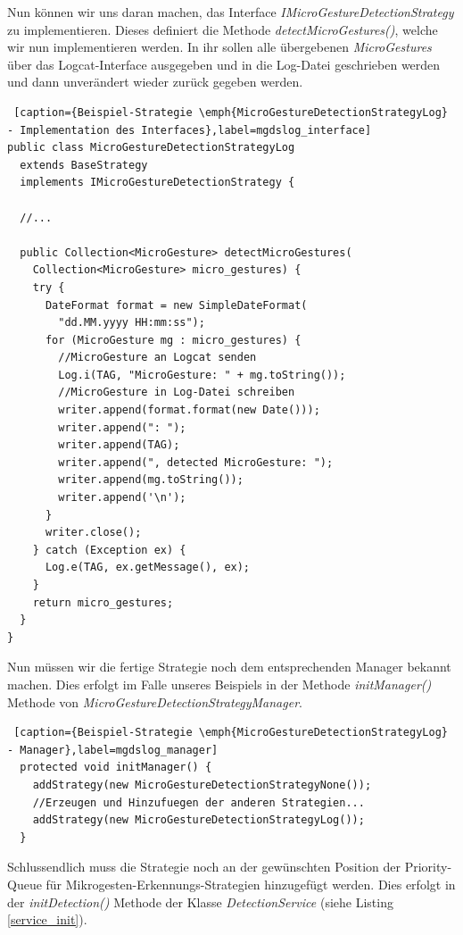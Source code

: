 Nun können wir uns daran machen, das Interface \emph{IMicroGestureDetectionStrategy} zu implementieren. Dieses definiert die Methode \emph{detectMicroGestures()}, welche wir nun implementieren werden. In ihr sollen alle übergebenen \emph{MicroGestures} über das Logcat-Interface ausgegeben und in die Log-Datei geschrieben werden und dann unverändert wieder zurück gegeben werden.

\begin{lstlisting} [caption={Beispiel-Strategie \emph{MicroGestureDetectionStrategyLog} - Implementation des Interfaces},label=mgdslog_interface]
public class MicroGestureDetectionStrategyLog 
  extends BaseStrategy 
  implements IMicroGestureDetectionStrategy {

  //...

  public Collection<MicroGesture> detectMicroGestures(
    Collection<MicroGesture> micro_gestures) {
    try {
      DateFormat format = new SimpleDateFormat(
        "dd.MM.yyyy HH:mm:ss");
      for (MicroGesture mg : micro_gestures) {
        //MicroGesture an Logcat senden
        Log.i(TAG, "MicroGesture: " + mg.toString());
        //MicroGesture in Log-Datei schreiben
        writer.append(format.format(new Date()));
        writer.append(": ");
        writer.append(TAG);
        writer.append(", detected MicroGesture: ");
        writer.append(mg.toString());
        writer.append('\n');
      }
      writer.close();
    } catch (Exception ex) {
      Log.e(TAG, ex.getMessage(), ex);
    }
    return micro_gestures;
  }
}
\end{lstlisting}

Nun müssen wir die fertige Strategie noch dem entsprechenden Manager bekannt machen. Dies erfolgt im Falle unseres Beispiels in der Methode \emph{initManager()} Methode von \emph{MicroGestureDetectionStrategyManager}.

\begin{lstlisting} [caption={Beispiel-Strategie \emph{MicroGestureDetectionStrategyLog} - Manager},label=mgdslog_manager]
  protected void initManager() {
    addStrategy(new MicroGestureDetectionStrategyNone());
    //Erzeugen und Hinzufuegen der anderen Strategien...
    addStrategy(new MicroGestureDetectionStrategyLog());
  }
\end{lstlisting}

Schlussendlich muss die Strategie noch an der gewünschten Position der Priority-Queue für Mikrogesten-Erkennungs-Strategien hinzugefügt werden. Dies erfolgt in der \emph{initDetection()} Methode der Klasse \emph{DetectionService} (siehe Listing \ref{service_init}).

